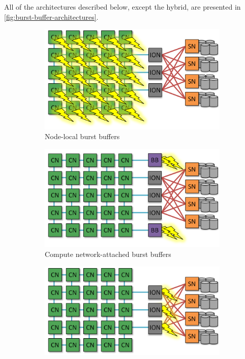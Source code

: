 \documentclass[thesis-en.tex]{subfiles}
\begin{document}
All of the architectures described below, except the hybrid, are presented in \autoref{fig:burst-buffer-architectures}.

\begin{figure}[htb] 
  \begin{subfigure}[b]{0.5\linewidth}
    \centering
    \includegraphics[width=0.8\linewidth]{images/architecture-on-cn.png} 
    \caption{Node-local burst buffers} 
    \label{fig:architecture-on-cn} 
    \vspace{4ex}
  \end{subfigure}
  \hfill
  \begin{subfigure}[b]{0.5\linewidth}
    \centering
    \includegraphics[width=0.8\linewidth]{images/architecture-on-edge.png} 
    \caption{Compute network-attached burst buffers} 
    \label{fig:architecture-on-edge}
    \vspace{4ex}
  \end{subfigure} 
  \begin{subfigure}[b]{0.5\linewidth}
    \centering
    \includegraphics[width=0.8\linewidth]{images/architecture-on-ion.png} 

\end{subfigure}
\end{figure}
\end{document}
